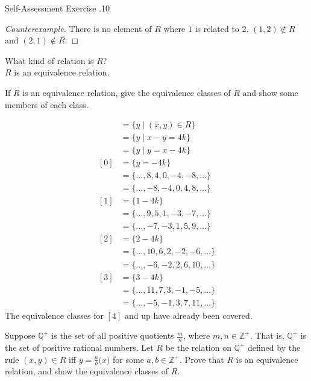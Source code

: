 \documentclass[\main/notes.tex]{subfiles}
\begin{document}
\begin{exercise}{Self-Assessment Exercise \thechapter.10}
\begin{questions}
\begin{questions}
\begin{answer}
\begin{description}
												\begin{proof}[Counterexample]
													There is no element of $R$ where $1$ is related to $2$. $(1, 2) \notin R$ and $(2, 1) \notin R$.
												\end{proof}
										\end{description}
									\end{answer}
								\item What kind of relation is $R$?\\
								{\answer $R$ is an equivalence relation.}
								\pagebreak
								\item If $R$ is an equivalence relation, give the equivalence classes of $R$ and show some members of each class.
									\begin{answer}
										\begin{align*}
											[x] &= \{y \mid (x, y) \in R\}\\
											&= \{y \mid x - y = 4k\}\\
											&= \{y \mid y = x - 4k\}\\
											[0] &= \{y = - 4k\}\\
											&= \{\ldots, 8, 4, 0, -4, -8, \ldots\}\\
											&= \{\ldots, -8, -4, 0, 4, 8, \ldots\}\\
											[1] &= \{1 - 4k\}\\
											&= \{\ldots, 9, 5, 1, -3, -7, \ldots\}\\
											&= \{\ldots, -7, -3, 1, 5, 9, \ldots\}\\
											[2] &= \{2 - 4k\}\\
											&= \{\ldots, 10, 6, 2, -2, -6, \ldots\}\\
											&= \{\ldots, -6, -2, 2, 6, 10, \ldots\}\\
											[3] &= \{3 - 4k\}\\
											&= \{\ldots, 11, 7, 3, -1, -5, \ldots\}\\
											&= \{\ldots, -5, -1, 3, 7, 11, \ldots\}
										\end{align*}
										The equivalence classes for $[4]$ and up have already been covered.
									\end{answer}
							\end{questions}
						\item Suppose $\mathbb{Q}^{+}$ is the set of all positive quotients $\frac{m}{n}$, where $m, n \in \mathbb{Z}^{+}$. That is, $\mathbb{Q}^{+}$ is the set of positive rational numbers. Let $R$ be the relation on $\mathbb{Q}^{+}$ defined by the rule $(x, y) \in R$ iff $y = \frac{a}{b}\bigl(x\bigr)$ for some $a, b \in \mathbb{Z}^{+}$. Prove that $R$ is an equivalence relation, and show the equivalence classes of $R$.\\

\end{questions}
\end{exercise}
\end{document}
